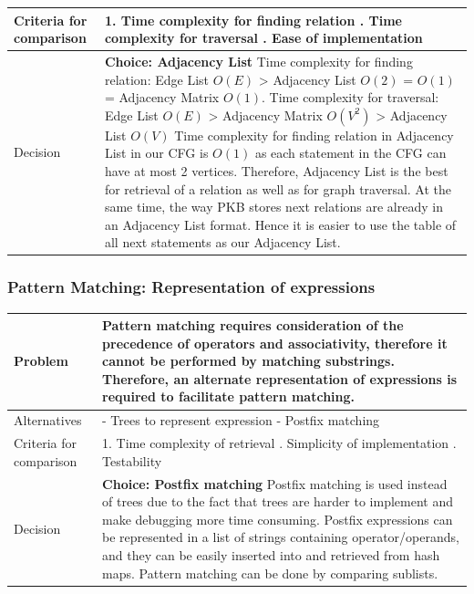 \documentclass[12pt]{article}
\begin{document}
{{{{{{{{{{\begin{tabular}{|L{5cm} | L{12cm}| }
 \\
\hline
    Criteria for comparison &
1. Time complexity for finding relation
. Time complexity for traversal
. Ease of implementation
 \\
 \hline
   Decision & \textbf{Choice: Adjacency List}
\newline
Time complexity for finding relation: Edge List $O(E)$ > Adjacency List $O(2)$ = $O(1)$ = Adjacency Matrix $O(1)$. \newline
Time complexity for traversal: Edge List $O(E)$ > Adjacency Matrix $O(V^2)$ > Adjacency List $O(V)$ \newline
Time complexity for finding relation in Adjacency List in our CFG is $O(1)$ as each statement in the CFG can have at most 2 vertices. Therefore, Adjacency List is the best for retrieval of a relation as well as for graph traversal. At the same time, the way PKB stores next relations are already in an Adjacency List format. Hence it is easier to use the table of all next statements as our Adjacency List.

 \\
 \hline
\end{tabular}
\subsubsection{Pattern Matching: Representation of expressions}
\begin{tabular}{|L{5cm} | L{12cm}| }
\hline
Problem &
Pattern matching requires consideration of the precedence of operators and associativity, therefore it cannot be performed by matching substrings. Therefore, an alternate representation of expressions is required to facilitate pattern matching.
 \\
    \hline
    Alternatives &
- Trees to represent expression
\newline - Postfix matching


 \\
\hline
    Criteria for comparison &
1. Time complexity of retrieval
. Simplicity of implementation
. Testability
 \\
 \hline
   Decision & \textbf{Choice:  Postfix matching}
\newline
Postfix matching is used instead of trees due to the fact that trees are harder to implement and make debugging more time consuming. Postfix expressions can be represented in a list of strings containing operator/operands, and they can be easily inserted into and retrieved from hash maps. Pattern matching can be done by comparing sublists.
 \\
 \hline
\end{tabular}
}}}}}}}}}}
\end{document}
